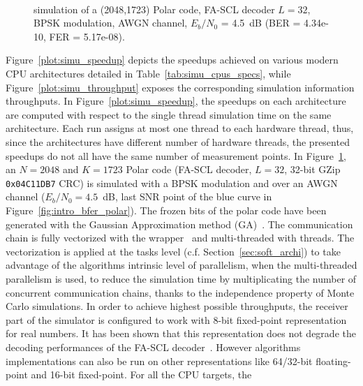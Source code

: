 \begin{figure}
  \centering
  \\
  \caption{\AFFECT simulation of a (2048,1723) Polar code, FA-SCL decoder
    $L=32$, BPSK modulation, AWGN channel, $E_b/N_0$ = 4.5~dB (BER = 4.34e-10,
    FER = 5.17e-08).}
  \label{plot:simu_speedup_throughput}
\end{figure}

Figure~\ref{plot:simu_speedup} depicts the speedups achieved on various modern
CPU architectures detailed in Table~\ref{tab:simu_cpus_specs}, while
Figure~\ref{plot:simu_throughput} exposes the corresponding simulation
information throughputs. In Figure~\ref{plot:simu_speedup}, the speedups on each
architecture are computed with respect to the single thread simulation time on
the same architecture. Each run assigns at most one \AFFECT thread to each
hardware thread, thus, since the architectures have different number of hardware
threads, the presented speedups do not all have the same number of measurement
points. In Figure~\ref{plot:simu_speedup_throughput}, an $N=2048$ and $K=1723$
Polar code (FA-SCL decoder, $L=32$, 32-bit GZip \verb|0x04C11DB7| CRC) is
simulated with a BPSK modulation and over an AWGN channel ($E_b/N_0 = 4.5$~dB,
last SNR point of the blue curve in Figure~\ref{fig:intro_bfer_polar}). The
frozen bits of the polar code have been generated with the Gaussian
Approximation method (GA)~\cite{Trifonov2012}. The communication chain is fully
vectorized with the \MIPP wrapper~\cite{Cassagne2018} and multi-threaded with
 threads. The vectorization is applied at the tasks level (c.f.
Section~\ref{sec:soft_archi}) to take advantage of the algorithms intrinsic
level of parallelism, when the multi-threaded parallelism is used, to reduce the
simulation time by multiplicating the number of concurrent communication chains,
thanks to the independence property of Monte Carlo simulations. In order to
achieve highest possible throughputs, the receiver part of the simulator is
configured to work with 8-bit fixed-point representation for real numbers. It
has been shown that this representation does not degrade the decoding
performances of the FA-SCL decoder~\cite{Leonardon2019}. However \AFFECT
algorithms implementations can also be run on other representations like
64/32-bit floating-point and 16-bit fixed-point. For all the CPU targets, the
